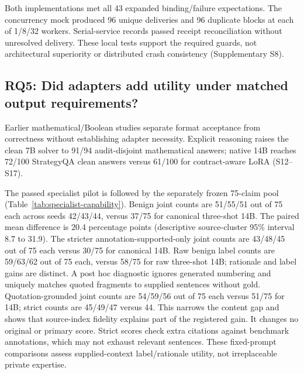 \documentclass[journal]{IEEEtran}
\begin{document}
Both implementations met all 43 expanded binding/failure expectations. The concurrency mock produced 96 unique deliveries and 96 duplicate blocks at each of 1/8/32 workers. Serial-service records passed receipt reconciliation without unresolved delivery. These local tests support the required guards, not architectural superiority or distributed crash consistency (Supplementary S8).

\subsection{RQ5: Did adapters add utility under matched output requirements?}
Earlier mathematical/Boolean studies separate format acceptance from correctness without establishing adapter necessity. Explicit reasoning raises the clean 7B solver to 91/94 audit-disjoint mathematical answers; native 14B reaches 72/100 StrategyQA clean answers versus 61/100 for contract-aware LoRA (S12--S17).

The passed specialist pilot is followed by the separately frozen 75-claim pool (Table~\ref{tab:specialist-capability}). Benign joint counts are 51/55/51 out of 75 each across seeds 42/43/44, versus 37/75 for canonical three-shot 14B. The paired mean difference is 20.4 percentage points (descriptive source-cluster 95\% interval 8.7 to 31.9). The stricter annotation-supported-only joint counts are 43/48/45 out of 75 each versus 30/75 for canonical 14B. Raw benign label counts are 59/63/62 out of 75 each, versus 58/75 for raw three-shot 14B; rationale and label gains are distinct. A post hoc diagnostic ignores generated numbering and uniquely matches quoted fragments to supplied sentences without gold. Quotation-grounded joint counts are 54/59/56 out of 75 each versus 51/75 for 14B; strict counts are 45/49/47 versus 44. This narrows the content gap and shows that source-index fidelity explains part of the registered gain. It changes no original or primary score. Strict scores check extra citations against benchmark annotations, which may not exhaust relevant sentences. These fixed-prompt comparisons assess supplied-context label/rationale utility, not irreplaceable private expertise.
\end{document}
